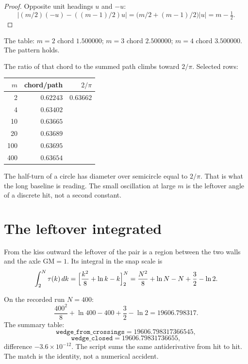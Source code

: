\documentclass[10pt,a4paper]{article}
\theoremstyle{plain}
\theoremstyle{definition}
\theoremstyle{remark}
\begin{document}
\begin{proof}
Opposite unit headings \(u\) and \(-u\):
\[
\bigl|(m/2)(-u)-((m-1)/2)u\bigr|=\bigl(m/2+(m-1)/2\bigr)|u|=m-\tfrac12.
\]
\end{proof}

The table: \(m=2\) chord \(1.500000\); \(m=3\) chord \(2.500000\); \(m=4\) chord \(3.500000\).
The pattern holds.

The ratio of that chord to the summed path climbs toward \(2/\pi\).
Selected rows:

\begin{center}
\begin{tabular}{@{}rrr@{}}
\toprule
\(m\) & chord/path & \(2/\pi\) \\
\midrule
2 & \(0.62243\) & \(0.63662\) \\
4 & \(0.63402\) & \\
10 & \(0.63665\) & \\
20 & \(0.63689\) & \\
100 & \(0.63695\) & \\
400 & \(0.63654\) & \\
\bottomrule
\end{tabular}
\end{center}

The half-turn of a circle has diameter over semicircle equal to \(2/\pi\).
That is what the long baseline is reading.
The small oscillation at large \(m\) is the leftover angle of a discrete hit, not a second constant.

\section{The leftover integrated}

From the kiss outward the leftover of the pair is a region between the two walls and the axle \(\mathrm{GM}=1\).
Its integral in the snap scale is
\[
\int_2^N\tau(k)\,dk
=\Bigl[\frac{k^2}{8}+\ln k-k\Bigr]_2^N
=\frac{N^2}{8}+\ln N-N+\frac32-\ln 2.
\]

On the recorded run \(N=400\):
\[
\frac{400^2}{8}+\ln 400-400+\frac32-\ln 2=19606.798317.
\]
The summary table:
\[
\texttt{wedge\_from\_crossings}=19606.798317366545,
\]
\[
\texttt{wedge\_closed}=19606.79831736655,
\]
difference \(-3.6\times 10^{-12}\).
The script sums the same antiderivative from hit to hit.
The match is the identity, not a numerical accident.
\end{document}
